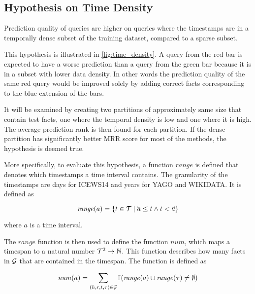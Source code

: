 \subsection{Hypothesis on Time Density}
\label{sec:hypothesis_time_density}

\begin{hypothesis}
\label{hyp:time_density}
Prediction quality of queries are higher on queries where the timestamps are in a temporally dense subset of the training dataset, compared to a sparse subset.
\end{hypothesis}



This hypothesis is illustrated in \autoref{fig:time_density}. A query from the red bar is expected to have a worse prediction than a query from the green bar because it is in a subset with lower data density. In other words the prediction quality of the same red query would be improved solely by adding correct facts corresponding to the blue extension of the bars.

It will be examined by creating two partitions of approximately same size that contain test facts, one where the temporal density is low and one where it is high. The average prediction rank is then found for each partition. If the dense partition has significantly better MRR score for most of the methods, the hypothesis is deemed true.

More specifically, to evaluate this hypothesis, a function $\mathit{range}$ is defined that denotes which timestamps a time interval contains. The granularity of the timestamps are days for ICEWS14 and years for YAGO and WIKIDATA. It is defined as

\begin{equation}
\mathit{range}(a) = \{ t \in \varT \mid \timebegin{a} \leq t \wedge t < \timeend{a} \}
\end{equation}

\noindent
where $a$ is a time interval.

The $\mathit{range}$ function is then used to define the function $\mathit{num}$, which maps a timespan to a natural number $\mathcal{T}^2 \rightarrow \mathbb{N}$. This function describes how many facts in $\mathcal{G}$ that are contained in the timespan. The function is defined as

\begin{equation}
\mathit{num}(a) = \sum\limits_{(h, r, t, \tau) \in \mathcal{G}} \mathbb{I} ( \mathit{range}(a) \cup \mathit{range}(\tau) \neq \emptyset )
\end{equation}

